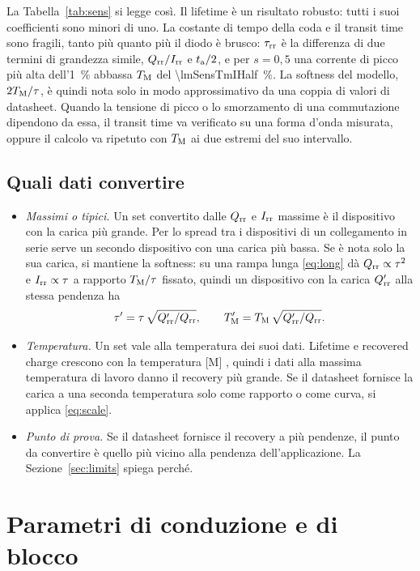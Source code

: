 \documentclass[10pt,a4paper]{scrartcl}
\let\newcommand\lmitdefine
\newcommand{\Irr}{I_\mathrm{rr}}
\newcommand{\Qrr}{Q_\mathrm{rr}}
\newcommand{\ta}{t_\mathrm{a}}
\newcommand{\taurr}{\tau_\mathrm{rr}}
\newcommand{\TM}{T_\mathrm{M}}
\begin{document}
La Tabella~\ref{tab:sens} si legge così. Il lifetime è un risultato robusto: tutti i suoi coefficienti sono minori di uno. La costante di tempo della coda e il transit time sono fragili, tanto più quanto più il diodo è brusco: $\taurr$ è la differenza di due termini di grandezza simile, $\Qrr/\Irr$ e $\ta/2$, e per $s = 0,5$ una corrente di picco più alta dell'\SI{1}{\percent} abbassa $\TM$ del \SI{\lmSensTmIHalf}{\percent}. La softness del modello, $2\TM/\tau$, è quindi nota solo in modo approssimativo da una coppia di valori di datasheet. Quando la tensione di picco o lo smorzamento di una commutazione dipendono da essa, il transit time va verificato su una forma d'onda misurata, oppure il calcolo va ripetuto con $\TM$ ai due estremi del suo intervallo.

\subsection{Quali dati convertire}
\label{sec:which}
\begin{itemize}
\item \emph{Massimi o tipici.} Un set convertito dalle $\Qrr$ e $\Irr$ massime è il dispositivo con la carica più grande. Per lo spread tra i dispositivi di un collegamento in serie serve un secondo dispositivo con una carica più bassa. Se è nota solo la sua carica, si mantiene la softness: su una rampa lunga \eqref{eq:long} dà $\Qrr \propto \tau^2$ e $\Irr \propto \tau$ a rapporto $\TM/\tau$ fissato, quindi un dispositivo con la carica $\Qrr'$ alla stessa pendenza ha
\begin{equation}
\tau' = \tau\,\sqrt{\Qrr'/\Qrr} , \qquad \TM' = \TM\,\sqrt{\Qrr'/\Qrr} .
\label{eq:scale}
\end{equation}
\item \emph{Temperatura.} Un set vale alla temperatura dei suoi dati. Lifetime e recovered charge crescono con la temperatura [M] \cite{lutz}, quindi i dati alla massima temperatura di lavoro danno il recovery più grande. Se il datasheet fornisce la carica a una seconda temperatura solo come rapporto o come curva, si applica \eqref{eq:scale}.
\item \emph{Punto di prova.} Se il datasheet fornisce il recovery a più pendenze, il punto da convertire è quello più vicino alla pendenza dell'applicazione. La Sezione~\ref{sec:limits} spiega perché.
\end{itemize}

\section{Parametri di conduzione e di blocco}
\label{sec:static}
\end{document}
